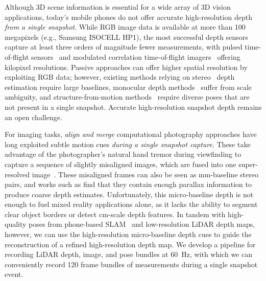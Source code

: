 Although 3D scene information is essential for a wide array of 3D vision applications, today's mobile phones do not offer accurate high-resolution depth \emph{from a single snapshot}. While RGB image data is available at more than 100 megapixels (e.g., Samsung ISOCELL HP1), the most successful depth sensors capture at least three orders of magnitude fewer measurements, with pulsed time-of-flight sensors~\cite{morimoto2020megapixel} and modulated correlation time-of-flight imagers~\cite{lange20003d,hansard2012time,kolb2010time} offering kilopixel resolutions. Passive approaches can offer higher spatial resolution by exploiting RGB data; however, existing methods relying on stereo~\cite{chen20173d, Chang2018, Kendall2017} depth estimation require large baselines, monocular depth methods~\cite{chen2016monocular,ranftl2021vision} suffer from scale ambiguity, and structure-from-motion methods~\cite{schonberger2016structure} require diverse poses that are not present in a single snapshot. Accurate high-resolution snapshot depth remains an open challenge. 

For imaging tasks, \emph{align and merge} computational photography approaches have long exploited subtle motion cues \emph{during a single snapshot capture}. These take advantage of the photographer's natural hand tremor during viewfinding to capture a sequence of slightly misaligned images, which are fused into one super-resolved image~\cite{wronski2019handheld, tsai1984multiframe}. These misaligned frames can also be seen as mm-baseline stereo pairs, and works such as \cite{yu20143d, joshi2014micro} find that they contain enough parallax information to produce coarse depth estimates. Unfortunately, this micro-baseline depth is not enough to fuel mixed reality applications alone, as it lacks the ability to segment clear object borders or detect cm-scale depth features. In tandem with high-quality poses from phone-based SLAM~\cite{durrant2006simultaneous} and low-resolution LiDAR depth maps, however, we can use the high-resolution micro-baseline depth cues to guide the reconstruction of a refined high-resolution depth map. We develop a pipeline for recording LiDAR depth, image, and pose bundles at 60~Hz, with which we can conveniently record 120 frame bundles of measurements during a single snapshot event.

